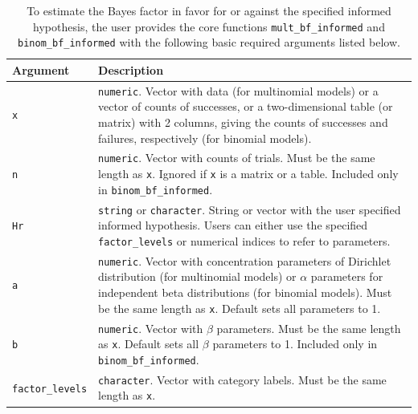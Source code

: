 \documentclass[
  english,
  man,floatsintext]{apa6}
\begin{document}
\begin{table}[H]
\caption{To estimate the Bayes factor in favor for or against the specified informed hypothesis, the user provides the core functions \texttt{mult\_bf\_informed} and \texttt{binom\_bf\_informed} with the following basic required arguments listed below.}
\label{table:arguments}
\begin{center}
\begin{tabular}{p{4cm}p{12cm}}
        \toprule
Argument & Description \\\midrule
\texttt{x} & \texttt{numeric}. Vector with data (for multinomial models) or a vector of counts of successes, or a two-dimensional table (or matrix) with 2 columns, giving the counts of successes and failures, respectively (for binomial models).  \\
\texttt{n} &  \texttt{numeric}. Vector with counts of trials. Must be the same length as \texttt{x}. Ignored if \texttt{x} is a matrix or a table. Included only in \texttt{binom\_bf\_informed}. \\
\texttt{Hr} & \texttt{string} or \texttt{character}. String or vector with the user specified informed hypothesis. Users can either use the specified \texttt{factor\_levels} or numerical indices to refer to parameters.\\
\texttt{a} & \texttt{numeric}. Vector with concentration parameters of Dirichlet distribution (for multinomial models) or $\alpha$ parameters for independent beta distributions (for binomial models). Must be the same length as \texttt{x}. Default sets all parameters to 1. \\
\texttt{b} & \texttt{numeric}. Vector with $\beta$ parameters. Must be the same length as \texttt{x}. Default sets all $\beta$ parameters to 1. Included only in \texttt{binom\_bf\_informed}.\\
\texttt{factor\_levels} &  \texttt{character}. Vector with category labels. Must be the same length as \texttt{x}.\\
\bottomrule
\end{tabular}
\end{center}
\end{table}
\end{document}
